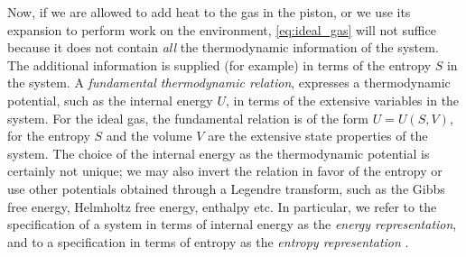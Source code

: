 Now, if we are allowed to add heat to the gas in the piston, or we use its expansion to perform work on the environment, \cref{eq:ideal_gas} will not suffice because it does not contain \emph{all} the thermodynamic information of the system. The additional information is supplied (for example) in terms of the entropy $S$ in the system. A \emph{fundamental thermodynamic relation}, expresses a thermodynamic potential, such as the internal energy $U$, in terms of the extensive variables in the system. For the ideal gas, the fundamental relation is of the form $U = U(S, V)$, for the entropy $S$ and the volume $V$ are the extensive state properties of the system. The choice of the internal energy as the thermodynamic potential is certainly not unique; we may also invert the relation in favor of the entropy or use other potentials obtained through a Legendre transform, such as the Gibbs free energy, Helmholtz free energy, enthalpy etc. In particular, we refer to the specification of a system in terms of internal energy as the \emph{energy representation}, and to a specification in terms of entropy as the \emph{entropy representation} \cite{VanderSchaft2021a}.

